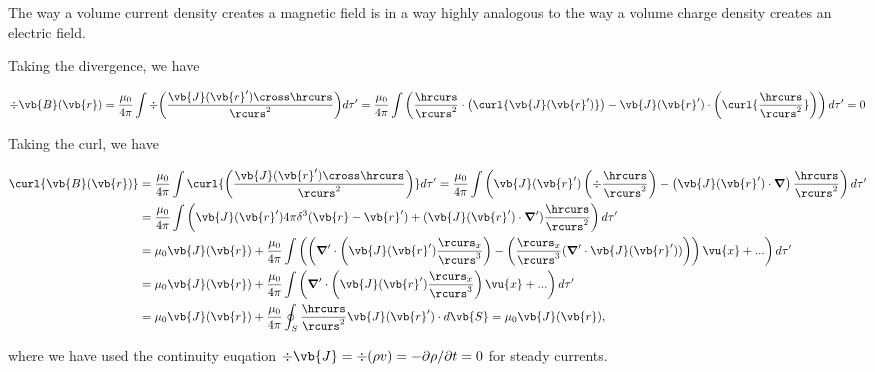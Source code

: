 \documentclass[english,a4paper,12pt]{report}
\begin{document}
The way a volume current density creates a magnetic field is in a way highly analogous to the way a volume charge density creates an electric field.

Taking the divergence, we have

\begin{equation}
    \div{\vb{B}(\vb{r} )} = \frac{\mu _{0} }{4\pi }\int \div{ \left(\frac{\vb{J} (\vb{r} ') \cross \hrcurs}{\rcurs ^2 }\right) } d\tau ' = \frac{\mu _{0} }{4\pi }\int \left( \frac{\hrcurs }{\rcurs ^2} \cdot \left(\curl{ \vb{J}(\vb{r} ') }\right) - \vb{J}(\vb{r} ') \cdot \left(\curl{ \frac{\hrcurs }{\rcurs ^2}  } \right) \right)  d\tau ' = 0
\end{equation}

Taking the curl, we have

\begin{equation} \label{ampere} 
    \begin{aligned} 
    \curl{\vb{B} (\vb{r} )} &=  \frac{\mu_0 }{4\pi } \int \curl{\left( \frac{\vb{J} (\vb{r} ') \cross \hrcurs}{\rcurs ^2 } \right)} d\tau ' =   \frac{\mu _{0} }{4\pi }\int \left(\vb{J} (\vb{r} ')\left( \div{\frac{\hrcurs }{\rcurs ^2} }  \right) - \left(\vb{J} (\vb{r} ')\cdot \boldsymbol{\nabla } \right)\frac{\hrcurs }{\rcurs ^2}  \right)  d\tau ' \\
    &= \frac{\mu_0 }{4\pi }\int \left( \vb{J} (\vb{r} ')4\pi \delta ^3 (\vb{r} -\vb{r} ') + (\vb{J}(\vb{r} ') \cdot \boldsymbol{\nabla }' )\frac{\hrcurs }{\rcurs ^2} \right)d\tau ' \\
    &= \mu_0 \vb{J} (\vb{r} ) + \frac{\mu_0 }{4\pi } \int \left(\left( \boldsymbol{\nabla }' \cdot \left( \vb{J} (\vb{r} ')  \frac{\rcurs _{x} }{\rcurs ^3 }   \right) - \left( \frac{\rcurs _{x} }{\rcurs ^3 } (\boldsymbol{\nabla }' \cdot \vb{J} (\vb{r} ') ) \right)  \right)\vu{x} + ...\right) d\tau ' \\
    &=  \mu_0 \vb{J} (\vb{r} )+ \frac{\mu_0 }{4\pi } \int \left( \boldsymbol{\nabla }' \cdot \left( \vb{J} (\vb{r} ')  \frac{\rcurs _{x} }{\rcurs ^3 }   \right)\vu{x} + ...\right) d\tau ' \\
    &= \mu_0 \vb{J} (\vb{r} ) + \frac{\mu_0 }{4\pi }  \oint_{S} \frac{\hrcurs }{\rcurs ^2} \vb{J} (\vb{r} ')\cdot d\vb{S} = \mu_0 \vb{J} (\vb{r} ),
    \end{aligned} 
\end{equation}

where we have used the continuity euqation \( \div{\vb{J} } = \div{(\rho v)}  = -\partial \rho /\partial t = 0\) for steady currents.  
\end{document}
